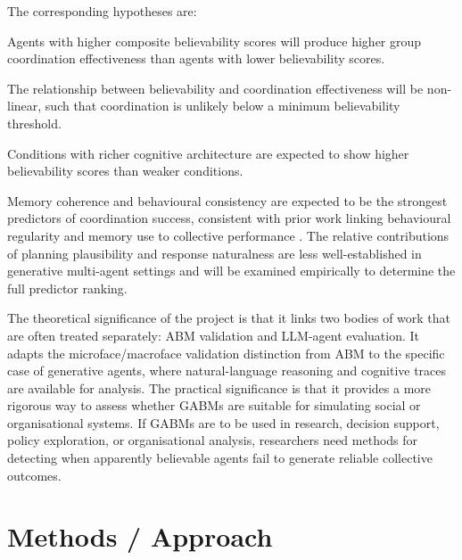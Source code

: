 \documentclass[11pt]{article}
\begin{document}
The corresponding hypotheses are:

\begin{description}[leftmargin=1.4cm, style=nextline]
    \item[H1] Agents with higher composite believability scores will produce higher group coordination effectiveness than agents with lower believability scores.
    \item[H2] The relationship between believability and coordination effectiveness will be non-linear, such that coordination is unlikely below a minimum believability threshold.
    \item[H3] Conditions with richer cognitive architecture are expected to show higher believability scores than weaker conditions.
    \item[H4] Memory coherence and behavioural consistency are expected to be the strongest predictors of coordination success, consistent with prior work linking behavioural regularity and memory use to collective performance \cite{hishiki2026memory}. The relative contributions of planning plausibility and response naturalness are less well-established in generative multi-agent settings and will be examined empirically to determine the full predictor ranking.
\end{description}

The theoretical significance of the project is that it links two bodies of work that are often treated separately: ABM validation and LLM-agent evaluation. It adapts the microface/macroface validation distinction from ABM to the specific case of generative agents, where natural-language reasoning and cognitive traces are available for analysis. The practical significance is that it provides a more rigorous way to assess whether GABMs are suitable for simulating social or organisational systems. If GABMs are to be used in research, decision support, policy exploration, or organisational analysis, researchers need methods for detecting when apparently believable agents fail to generate reliable collective outcomes.

\section{Methods / Approach}
\end{document}
